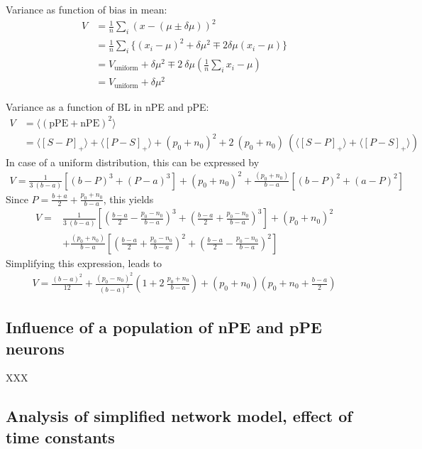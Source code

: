\documentclass[10pt,a4paper,draft]{article}
\begin{document}
Variance as function of bias in mean:
\begin{align*}
V &= \frac{1}{n} \sum_i \left( x - \left(\mu \pm \delta\mu\right)\right)^2 \\
&= \frac{1}{n} \sum_i \lbrace  \left( x_i - \mu \right)^2 + \delta\mu^2 \mp 2\delta\mu (x_i - \mu)\rbrace \\
&= V_\mathrm{uniform} + \delta\mu^2 \mp 2\ \delta\mu \left( \frac{1}{n} \sum_i x_i- \mu\right) \\
&= V_\mathrm{uniform} + \delta\mu^2
\end{align*}
%

Variance as a function of BL in nPE and pPE:
%
\begin{align*}
V &= \langle \left( \mathrm{pPE} + \mathrm{nPE} \right)^2 \rangle \\
&= \langle \left[ S-P\right]_+\rangle + \langle \left[ P-S\right]_+\rangle + (p_0 + n_0)^2 + 2\ (p_0 + n_0)\ \left( \langle \left[ S-P\right]_+\rangle + \langle \left[ P-S\right]_+ \rangle\right)
\end{align*}
%
In case of a uniform distribution, this can be expressed by
%
\begin{align*}
V = \frac{1}{3\ (b-a)} \left[ (b-P)^3 + (P-a)^3\right] + (p_0 + n_0)^2 + \frac{(p_0 + n_0)}{b-a} \left[ (b-P)^2 + (a-P)^2\right]
\end{align*}
%
Since $P = \frac{b+a}{2} + \frac{p_0 + n_0}{b-a}$, this yields
%
\begin{align*}
V =& \frac{1}{3\ (b-a)} \left[ \left( \frac{b-a}{2} - \frac{p_0 - n_0}{b-a}\right)^3 + \left( \frac{b-a}{2} + \frac{p_0-n_0}{b-a}\right)^3\right] + (p_0 + n_0)^2 \\
&+ \frac{(p_0 + n_0)}{b-a} \left[ \left( \frac{b-a}{2} + \frac{p_0-n_0}{b-a}\right)^2 + \left( \frac{b-a}{2} - \frac{p_0 - n_0}{b-a}\right)^2\right]
\end{align*}
%
Simplifying this expression, leads to
%
\begin{align*}
V =  \frac{(b-a)^2}{12} + \frac{(p_0-n_0)^2}{(b-a)^2} \left( 1 + 2\ \frac{p_0+n_0}{b-a}\right) + (p_0 + n_0) \left( p_0 + n_0 + \frac{b-a}{2}\right)
\end{align*}
%


\subsection*{Influence of a population of nPE and pPE neurons}
XXX


\subsection*{Analysis of simplified network model, effect of time constants}
\end{document}
